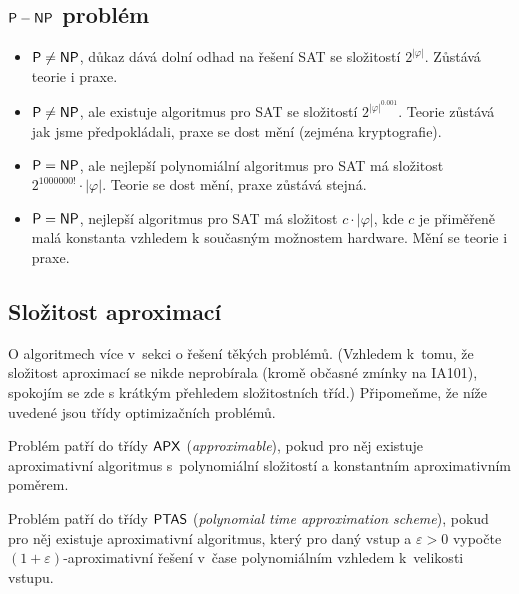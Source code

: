 \subsection{${\mathsf{P}}-{\mathsf{NP}}$ problém}

\begin{itemize}
\item ${\mathsf{P}} \neq {\ensuremath{\mathsf{NP}}}$, důkaz dává dolní odhad na řešení SAT se složitostí
    $2^{\lvert\varphi\rvert}$.
    Zůstává teorie i praxe.

\item ${\mathsf{P}} \neq {\ensuremath{\mathsf{NP}}}$, ale existuje algoritmus pro SAT se složitostí
    $2^{\lvert\varphi\rvert^{0.001}}$.
    Teorie zůstává jak jsme předpokládali, praxe se
    dost mění (zejména kryptografie).

\item ${\mathsf{P}} = {\mathsf{NP}}$, ale nejlepší polynomiální algoritmus pro SAT má
    složitost $2^{1000000!} \cdot \lvert \varphi \rvert$.  Teorie se
    dost mění, praxe zůstává stejná.

\item ${\mathsf{P}} = {\mathsf{NP}}$, nejlepší algoritmus pro SAT má složitost
    $c \cdot \lvert \varphi \rvert$, kde $c$ je přiměřeně malá konstanta
    vzhledem k současným možnostem hardware.
    Mění se teorie i praxe.
\end{itemize}

\subsection{Složitost aproximací}

O algoritmech více v~sekci o řešení těkých problémů.
(Vzhledem k~tomu, že složitost aproximací se nikde neprobírala (kromě
občasné zmínky 
na IA101), spokojím se zde s krátkým přehledem složitostních tříd.)
Připomeňme, že níže uvedené jsou třídy optimizačních problémů.

\begin{definition}
    Problém patří do třídy ${\mathsf{APX}}$ ({\em approximable}), pokud pro něj existuje
    aproximativní algoritmus s~polynomiální složitostí
    a konstantním aproximativním poměrem.
\end{definition}

\begin{definition}
    Problém patří do třídy ${\mathsf{PTAS}}$ ({\em polynomial time approximation
    scheme}), pokud pro něj existuje
    aproximativní algoritmus, který pro daný vstup a $\varepsilon > 0$
    vypočte $(1+\varepsilon)$-aproximativní řešení
    v~čase polynomiálním vzhledem k~velikosti vstupu.
\end{definition}

